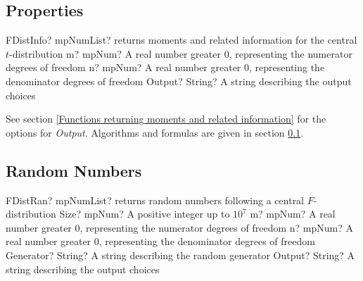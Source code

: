 





\subsection{Properties}
\label{FDistributionProperties}

\begin{mpFunctionsExtract}
	\mpFunctionThree
	{FDistInfo? mpNumList? returns moments and related information for the central $t$-distribution}
	{m? mpNum? A real number greater 0, representing the numerator  degrees of freedom}
	{n? mpNum? A real number greater 0, representing the denominator degrees of freedom}
	{Output? String? A string describing the output choices}
\end{mpFunctionsExtract}

\vspace{0.3cm}

See section \ref{Functions returning moments and related information} for the options for {\itshape\sffamily Output}. Algorithms and formulas are given in section \ref{FDistributionProperties}.



\subsection{Random Numbers}
\label{FDistributionRandom}


\begin{mpFunctionsExtract}
	\mpFunctionFive
	{FDistRan? mpNumList? returns random numbers following a central $F$-distribution}
	{Size? mpNum? A positive integer up to $10^7$}
	{m? mpNum? A real number greater 0, representing the numerator  degrees of freedom}
	{n? mpNum? A real number greater 0, representing the denominator degrees of freedom}
	{Generator? String? A string describing the random generator}
	{Output? String? A string describing the output choices}
\end{mpFunctionsExtract}

